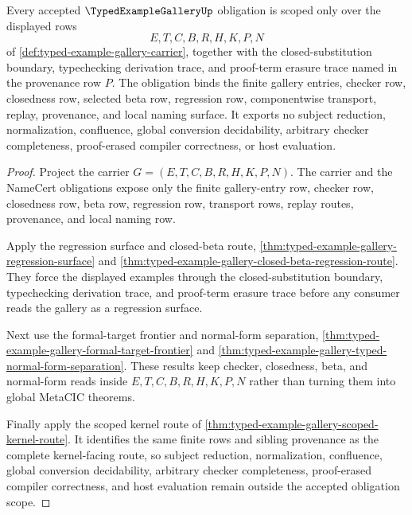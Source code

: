 \begin{theorem}
\label{thm:typed-example-gallery-scope-binding}
Every accepted $\TypedExampleGalleryUp$ obligation is scoped only over the displayed rows
$$
E,T,C,B,R,H,K,P,N
$$
of \autoref{def:typed-example-gallery-carrier}, together with the closed-substitution boundary, typechecking derivation trace, and proof-term erasure trace named in the provenance row $P$. The obligation binds the finite gallery entries, checker row, closedness row, selected beta row, regression row, componentwise transport, replay, provenance, and local naming surface. It exports no subject reduction, normalization, confluence, global conversion decidability, arbitrary checker completeness, proof-erased compiler correctness, or host evaluation.
\end{theorem}
\begin{proof}
Project the carrier $G=(E,T,C,B,R,H,K,P,N)$. The carrier and the NameCert obligations expose only the finite gallery-entry row, checker row, closedness row, beta row, regression row, transport rows, replay routes, provenance, and local naming row.

Apply the regression surface and closed-beta route, \autoref{thm:typed-example-gallery-regression-surface} and \autoref{thm:typed-example-gallery-closed-beta-regression-route}. They force the displayed examples through the closed-substitution boundary, typechecking derivation trace, and proof-term erasure trace before any consumer reads the gallery as a regression surface.

Next use the formal-target frontier and normal-form separation, \autoref{thm:typed-example-gallery-formal-target-frontier} and \autoref{thm:typed-example-gallery-typed-normal-form-separation}. These results keep checker, closedness, beta, and normal-form reads inside $E,T,C,B,R,H,K,P,N$ rather than turning them into global MetaCIC theorems.

Finally apply the scoped kernel route of \autoref{thm:typed-example-gallery-scoped-kernel-route}. It identifies the same finite rows and sibling provenance as the complete kernel-facing route, so subject reduction, normalization, confluence, global conversion decidability, arbitrary checker completeness, proof-erased compiler correctness, and host evaluation remain outside the accepted obligation scope.
\end{proof}

